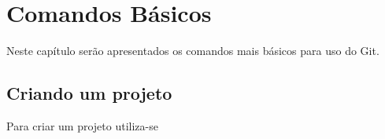 % 
% 
% 
% 
% 
\chapter{Comandos B\'{a}sicos}
Neste cap\'{i}tulo ser\~{a}o apresentados os comandos mais b\'{a}sicos para uso do Git.

\section{Criando um projeto}
Para criar um projeto utiliza-se
